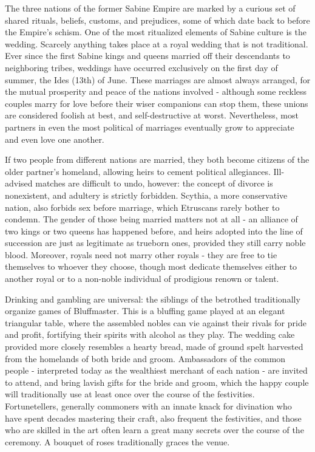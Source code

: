 \documentclass[blue]{Kos}
\begin{document}
\name{\bSabine{}}

The three nations of the former Sabine Empire are marked by a curious set of shared rituals, beliefs, customs, and prejudices, some of which date back to before the Empire's schism. One of the most ritualized elements of Sabine culture is the wedding. Scarcely anything takes place at a royal wedding that is not traditional. Ever since the first Sabine kings and queens married off their descendants to neighboring tribes, weddings have occurred exclusively on the first day of summer, the Ides (13th) of June. These marriages are almost always arranged, for the mutual prosperity and peace of the nations involved - although some reckless couples marry for love before their wiser companions can stop them, these unions are considered foolish at best, and self-destructive at worst. Nevertheless, most partners in even the most political of marriages eventually grow to appreciate and even love one another.

If two people from different nations are married, they both become citizens of the older partner’s homeland, allowing heirs to cement political allegiances. Ill-advised matches are difficult to undo, however: the concept of divorce is nonexistent, and adultery is strictly forbidden. Scythia, a more conservative nation, also forbids sex before marriage, which Etruscans rarely bother to condemn. The gender of those being married matters not at all - an alliance of two kings or two queens has happened before, and heirs adopted into the line of succession are just as legitimate as trueborn ones, provided they still carry noble blood. Moreover, royals need not marry other royals - they are free to tie themselves to whoever they choose, though most dedicate themselves either to another royal or to a non-noble individual of prodigious renown or talent.

Drinking and gambling are universal: the siblings of the betrothed traditionally organize games of Bluffmaster. This is a bluffing game played at an elegant triangular table, where the assembled nobles can vie against their rivals for pride and profit, fortifying their spirits with alcohol as they play. The wedding cake provided more closely resembles a hearty bread, made of ground spelt harvested from the homelands of both bride and groom. Ambassadors of the common people - interpreted today as the wealthiest merchant of each nation - are invited to attend, and bring lavish gifts for the bride and groom, which the happy couple will traditionally use at least once over the course of the festivities. Fortunetellers, generally commoners with an innate knack for divination who have spent decades mastering their craft, also frequent the festivities, and those who are skilled in the art often learn a great many secrets over the course of the ceremony. A bouquet of roses traditionally graces the venue. 
\end{document}
